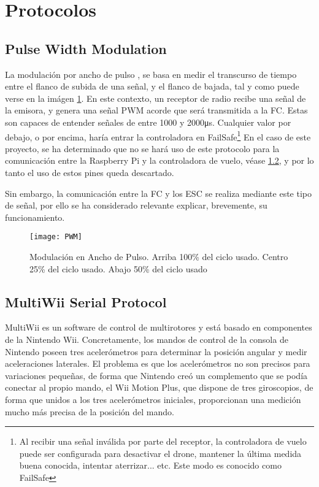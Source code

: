 \newpage





\section{Protocolos}

\subsection{Pulse Width Modulation}
\label{subsec:PWM}



La modulación por ancho de pulso \citep{wiki:PWM}, se basa en medir el transcurso de tiempo entre el flanco de subida de una señal, y el flanco de bajada, tal y como puede verse en la imágen \ref{fig:PWM}.
En este contexto, un receptor de radio recibe una señal de la emisora,  y genera una señal PWM acorde que será transmitida a la FC.
Estas son capaces de entender señales de entre 1000 y 2000\si{\us}. Cualquier valor por debajo, o por encima, haría entrar la controladora en FailSafe\footnote{Al recibir una señal inválida por parte del receptor, la controladora de vuelo puede ser configurada para desactivar el drone, mantener la última medida buena conocida, intentar aterrizar... etc. Este modo es conocido como FailSafe}
En el caso de este proyecto, se ha determinado que no se hará uso de este protocolo para la comunicación entre la Raspberry Pi y la controladora de vuelo, véase \ref{subsec:MSP}, y por lo tanto el uso de estos pines queda descartado.

Sin embargo, la comunicación entre la FC y los ESC se realiza mediante este tipo de señal, por ello se ha considerado relevante explicar, brevemente, su funcionamiento.
\begin{figure}[H]
	\centering
	\texttt{[image: PWM]}
	\caption{Modulación en Ancho de Pulso. Arriba 100\% del ciclo usado. Centro 25\% del ciclo usado. Abajo 50\% del ciclo usado}\label{fig:PWM}
\end{figure}


\subsection{MultiWii Serial Protocol}
\label{subsec:MSP}

MultiWii es un software de control de multirotores y está basado en componentes de la Nintendo Wii. Concretamente, los mandos de control de la consola de Nintendo poseen tres acelerómetros para determinar la posición angular y medir aceleraciones laterales. El problema es que los acelerómetros no son precisos para variaciones pequeñas, de forma que Nintendo creó un complemento que se podía conectar al propio mando, el Wii Motion Plus, que dispone de tres giroscopios, de forma que unidos a los tres acelerómetros iniciales, proporcionan una medición mucho más precisa de la posición del mando.

